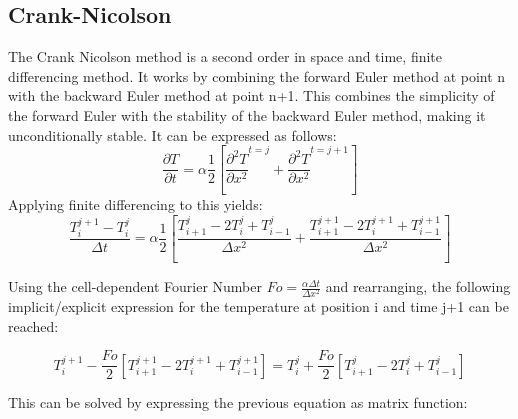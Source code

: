 \documentclass[conf]{new-aiaa}
\begin{document}
\subsection{Crank-Nicolson}
The Crank Nicolson method is a second order in space and time, finite differencing method. It works by combining the forward Euler method at point n with the backward Euler method at point n+1. This combines the simplicity of the forward Euler with the stability of the backward Euler method, making it unconditionally stable. It can be expressed as follows:
\begin{equation}
\label{sample:equation}
\frac{\partial T}{\partial t}=\alpha \frac{1}{2}\left[\frac{\partial^2 T}{\partial x^2}^{t=j}+\frac{\partial^2 T}{\partial x^2}^{t=j+1}\right]
\end{equation}
Applying finite differencing to this yields:
\begin{equation}
\label{sample:equation}
\frac{T_i^{j+1}-T_i^j}{\Delta t}=\alpha \frac{1}{2}\left[\frac{T_{i+1}^j-2T_i^j+T_{i-1}^j}{\Delta x^2}+\frac{T_{i+1}^{j+1}-2T_i^{j+1}+T_{i-1}^{j+1}}{\Delta x^2}\right]
\end{equation}

Using the cell-dependent Fourier Number $Fo=\frac{\alpha \Delta t}{\Delta x^2}$ and rearranging, the following implicit/explicit expression for the temperature at position i and time j+1 can be reached:

\begin{equation}
\label{sample:equation}
  T_i^{j+1}-\frac{Fo}{2}\left[T_{i+1}^{j+1}-2T_i^{j+1}+T_{i-1}^{j+1}\right]=T_i^j+\frac{Fo}{2}\left[T_{i+1}^j-2T_i^j+T_{i-1}^j\right]
\end{equation}

This can be solved by expressing the previous equation as matrix function:
\end{document}
